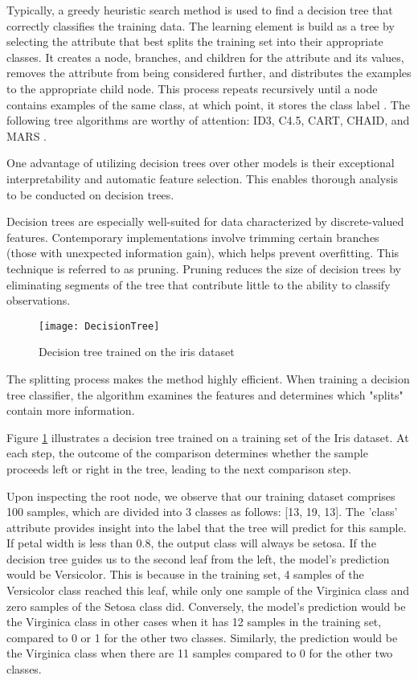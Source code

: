 Typically, a greedy heuristic search method is used to find a decision tree that correctly classifies the training data. The learning element is build as a tree by selecting the attribute that best splits the training set into their appropriate classes. It creates a node, branches, and children for the attribute and its values, removes the attribute from being considered further, and distributes the examples to the appropriate child node. This process repeats recursively until a node contains examples of the same class, at which point, it stores the class label \cite{J_Zico_Kolter2006}. The following tree algorithms are worthy of attention:  ID3, C4.5, CART, CHAID, and MARS \cite{Tom_M_Mitchell1997, Jerome_H_Friedman1991}.

One advantage of utilizing decision trees over other models is their exceptional interpretability and automatic feature selection. This enables thorough analysis to be conducted on decision trees.

Decision trees are especially well-suited for data characterized by discrete-valued features. Contemporary implementations involve trimming certain branches (those with unexpected information gain), which helps prevent overfitting. This technique is referred to as pruning. Pruning reduces the size of decision trees by eliminating segments of the tree that contribute little to the ability to classify observations.

\begin{figure}[ht]
	\centering
	\texttt{[image: DecisionTree]}
	  \caption{Decision tree trained on the iris dataset}
  \label{fig:DecisionTree}
\end{figure}

The splitting process makes the method highly efficient. When training a decision tree classifier, the algorithm examines the features and determines which "splits" contain more information.

Figure \ref{fig:DecisionTree} illustrates a decision tree trained on a training set of the Iris dataset. At each step, the outcome of the comparison determines whether the sample proceeds left or right in the tree, leading to the next comparison step.

Upon inspecting the root node, we observe that our training dataset comprises 100 samples, which are divided into 3 classes as follows: [13, 19, 13].
The 'class' attribute provides insight into the label that the tree will predict for this sample. If petal width is less than 0.8, the output class will always be setosa. If the decision tree guides us to the second leaf from the left, the model's prediction would be Versicolor. This is because in the training set, 4 samples of the Versicolor class reached this leaf, while only one sample of the Virginica class and zero samples of the Setosa class did. Conversely, the model's prediction would be the Virginica class in other cases when it has 12 samples in the training set, compared to 0 or 1 for the other two classes. Similarly, the prediction would be the Virginica class when there are 11 samples compared to 0 for the other two classes.\\

